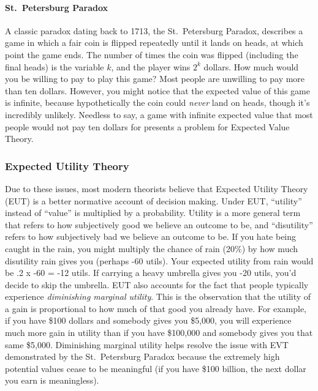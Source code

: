 \documentclass[
]{krantz}
\begin{document}
\paragraph*{St.~Petersburg Paradox}\label{st.-petersburg-paradox}

A classic paradox dating back to 1713, the St.~Petersburg Paradox, describes a game in which a fair coin is flipped repeatedly until it lands on heads, at which point the game ends. The number of times the coin was flipped (including the final heads) is the variable \(k\), and the player wins \(2^k\) dollars. How much would you be willing to pay to play this game? Most people are unwilling to pay more than ten dollars. However, you might notice that the expected value of this game is infinite, because hypothetically the coin could \emph{never} land on heads, though it's incredibly unlikely. Needless to say, a game with infinite expected value that most people would not pay ten dollars for presents a problem for Expected Value Theory.

\subsubsection*{Expected Utility Theory}\label{expected-utility-theory}


Due to these issues, most modern theorists believe that Expected Utility Theory (EUT) is a better normative account of decision making. Under EUT, ``utility'' instead of ``value'' is multiplied by a probability. Utility is a more general term that refers to how subjectively good we believe an outcome to be, and ``disutility'' refers to how subjectively bad we believe an outcome to be. If you hate being caught in the rain, you might multiply the chance of rain (20\%) by how much disutility rain gives you (perhaps -60 utils). Your expected utility from rain would be .2 x -60 = -12 utils. If carrying a heavy umbrella gives you -20 utils, you'd decide to skip the umbrella. EUT also accounts for the fact that people typically experience \emph{diminishing marginal utility}. This is the observation that the utility of a gain is proportional to how much of that good you already have. For example, if you have \$100 dollars and somebody gives you \$5,000, you will experience much more gain in utility than if you have \$100,000 and somebody gives you that same \$5,000. Diminishing marginal utility helps resolve the issue with EVT demonstrated by the St.~Petersburg Paradox because the extremely high potential values cease to be meaningful (if you have \$100 billion, the next dollar you earn is meaningless).
\end{document}
